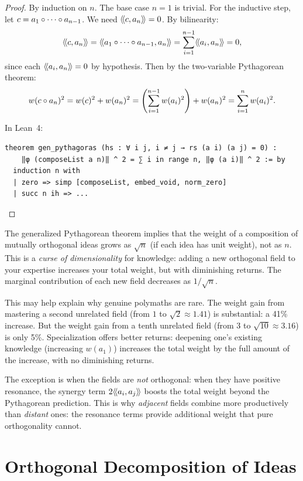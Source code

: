 \begin{proof}
By induction on $n$. The base case $n = 1$ is trivial. For the inductive step,
let $c = a_1 \circ \cdots \circ a_{n-1}$. We need $\langle\!\langle c, a_n \rangle\!\rangle = 0$. By
bilinearity:
\[
  \langle\!\langle c, a_n \rangle\!\rangle = \langle\!\langle a_1 \circ \cdots \circ a_{n-1}, a_n \rangle\!\rangle
  = \sum_{i=1}^{n-1} \langle\!\langle a_i, a_n \rangle\!\rangle = 0,
\]
since each $\langle\!\langle a_i, a_n \rangle\!\rangle = 0$ by hypothesis. Then by the two-variable
Pythagorean theorem:
\[
  w(c \circ a_n)^2 = w(c)^2 + w(a_n)^2
  = \left(\sum_{i=1}^{n-1} w(a_i)^2\right) + w(a_n)^2
  = \sum_{i=1}^n w(a_i)^2.
\]

In Lean~4:
\begin{lstlisting}
theorem gen_pythagoras (hs : ∀ i j, i ≠ j → rs (a i) (a j) = 0) :
    ‖φ (composeList a n)‖ ^ 2 = ∑ i in range n, ‖φ (a i)‖ ^ 2 := by
  induction n with
  | zero => simp [composeList, embed_void, norm_zero]
  | succ n ih => ...
\end{lstlisting}
\end{proof}

\begin{interpretation}
\label{interp:dimensionality}
The generalized Pythagorean theorem implies that the weight of a composition
of mutually orthogonal ideas grows as $\sqrt{n}$ (if each idea has unit weight),
not as $n$. This is a \emph{curse of dimensionality} for knowledge: adding a
new orthogonal field to your expertise increases your total weight, but with
diminishing returns. The marginal contribution of each new field decreases as
$1/\sqrt{n}$.

This may help explain why genuine polymaths are rare. The weight gain from
mastering a second unrelated field (from $1$ to $\sqrt{2} \approx 1.41$) is
substantial: a 41\% increase. But the weight gain from a tenth unrelated field
(from $3$ to $\sqrt{10} \approx 3.16$) is only 5\%. Specialization offers
better returns: deepening one's existing knowledge (increasing $w(a_1)$)
increases the total weight by the full amount of the increase, with no
diminishing returns.

The exception is when the fields are \emph{not} orthogonal: when they have
positive resonance, the synergy term $2\langle\!\langle a_i, a_j \rangle\!\rangle$ boosts the total weight
beyond the Pythagorean prediction. This is why \emph{adjacent} fields combine
more productively than \emph{distant} ones: the resonance terms provide
additional weight that pure orthogonality cannot.
\end{interpretation}


\section{Orthogonal Decomposition of Ideas}

